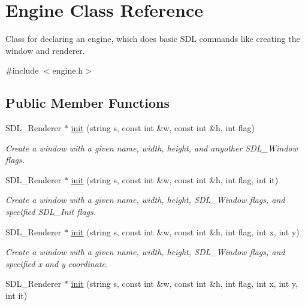 \hypertarget{classEngine}{}\section{Engine Class Reference}
\label{classEngine}


Class for declaring an engine, which does basic S\+DL commands like creating the window and renderer.  




{\ttfamily \#include $<$engine.\+h$>$}

\subsection*{Public Member Functions}
\begin{DoxyCompactItemize}
\item 
S\+D\+L\+\_\+\+Renderer $\ast$ \hyperlink{classEngine_af02c5fcfad817c5c8bc0a3cacfd9d4f8}{init} (string s, const int \&w, const int \&h, int flag)\hypertarget{classEngine_af02c5fcfad817c5c8bc0a3cacfd9d4f8}{}\label{classEngine_af02c5fcfad817c5c8bc0a3cacfd9d4f8}

\begin{DoxyCompactList}\small\item\em Create a window with a given name, width, height, and anyother S\+D\+L\+\_\+\+Window flags. \end{DoxyCompactList}\item 
S\+D\+L\+\_\+\+Renderer $\ast$ \hyperlink{classEngine_aca16d18226665d75acad41b48a8da989}{init} (string s, const int \&w, const int \&h, int flag, int it)\hypertarget{classEngine_aca16d18226665d75acad41b48a8da989}{}\label{classEngine_aca16d18226665d75acad41b48a8da989}

\begin{DoxyCompactList}\small\item\em Create a window with a given name, width, height, S\+D\+L\+\_\+\+Window flags, and specified S\+D\+L\+\_\+\+Init flags. \end{DoxyCompactList}\item 
S\+D\+L\+\_\+\+Renderer $\ast$ \hyperlink{classEngine_a4f80e210f2ae48208eed4ad17c309120}{init} (string s, const int \&w, const int \&h, int flag, int x, int y)\hypertarget{classEngine_a4f80e210f2ae48208eed4ad17c309120}{}\label{classEngine_a4f80e210f2ae48208eed4ad17c309120}

\begin{DoxyCompactList}\small\item\em Create a window with a given name, width, height, S\+D\+L\+\_\+\+Window flags, and specified x and y coordinate. \end{DoxyCompactList}\item 
S\+D\+L\+\_\+\+Renderer $\ast$ \hyperlink{classEngine_aa96fc831b44b6aae0f499360609c574d}{init} (string s, const int \&w, const int \&h, int flag, int x, int y, int it)\hypertarget{classEngine_aa96fc831b44b6aae0f499360609c574d}{}\label{classEngine_aa96fc831b44b6aae0f499360609c574d}


\end{DoxyCompactItemize}
